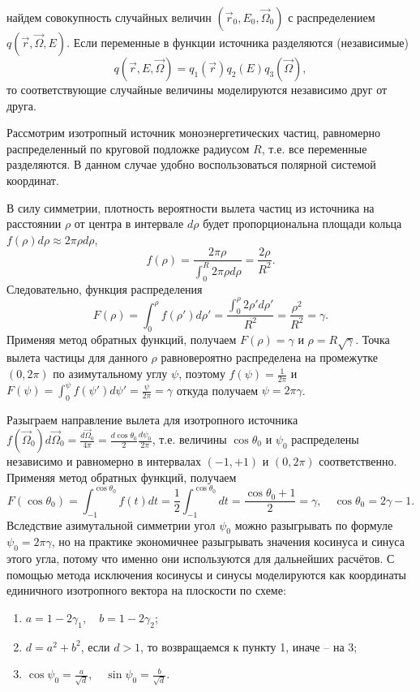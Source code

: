 \documentclass[
11pt,
master, %
subf, %
href, %
colorlinks=true, %
]{disser}
\begin{document}
найдем совокупность случайных величин $\left(\vec{r}_{0}, E_{0},  \vec{\Omega }_{0} \right)$ с распределением $q \left(\vec{r},\vec{\Omega },E \right)$. Если переменные в функции источника разделяются (независимые)
\[q \left(\vec{r},E,\vec{\Omega } \right)=q_{1} \left(\vec{r} \right)q_{2} (E)q_{3} \left(\vec{\Omega } \right),\]
 то соответствующие случайные величины моделируются независимо друг от друга.

Рассмотрим изотропный источник моноэнергетических частиц, равномерно распределенный по круговой подложке радиусом $R$, т.е. все переменные разделяются. В данном случае удобно воспользоваться полярной системой координат.

В силу симметрии, плотность вероятности вылета частиц из источника на расстоянии  $\rho $ от центра в интервале $d\rho $ будет пропорциональна площади кольца  $f(\rho )d\rho \approx 2\pi \rho d\rho $,
\[f(\rho )=\frac{2\pi \rho }{\int _{0}^{R}2\pi \rho d\rho  } =\frac{2\rho }{R^{2} } .\]
Следовательно, функция распределения
\[F(\rho )=\int _{0}^{\rho }f \left( \rho ' \right)d\rho '=\frac{\int _{0}^{\rho }2 \rho 'd\rho '}{R^{2} } =\frac{\rho ^{2} }{R^{2} } =\gamma .\]
Применяя метод обратных функций, получаем $F(\rho )=\gamma $ и $\rho =R\sqrt{\gamma } $. Точка вылета частицы для данного $\rho $ равновероятно распределена на промежутке $(0,2\pi )$ по азимутальному углу $\psi $, поэтому $f(\psi )=\frac{1}{2\pi } $ и $F(\psi )=\int _{0}^{\psi }f \left(\psi ' \right)d\psi '=\frac{\psi }{2\pi } =\gamma $ откуда получаем $\psi =2\pi \gamma $.

Разыграем направление вылета для  изотропного источника   $f \left(\vec{\Omega }_{0} \right)d\vec{\Omega }_{0} =\frac{d\vec{\Omega }_{0} }{4\pi } =\frac{d\cos \theta _{0} }{2} \frac{d\psi _{0} }{2\pi } $, т.е. величины $\cos \theta _{0} $ и $\psi _{0} $ распределены независимо и равномерно в интервалах $(-1,+1)$ и $(0,2\pi )$ соответственно. Применяя метод обратных функций, получаем
\[F(\cos \theta _{0} )=\int _{-1}^{\cos \theta _{0} }f(t)dt =\frac{1}{2} \int _{-1}^{\cos \theta _{0} }dt =\frac{\cos \theta _{0} +1}{2} =\gamma, \quad \cos \theta _{0} =2\gamma -1.\]
Вследствие азимутальной симметрии угол $\psi _{0} $ можно разыгрывать по формуле $\psi _{0} =2\pi \gamma $, но на практике экономичнее разыгрывать значения косинуса и синуса этого угла, потому что именно они используются для дальнейших расчётов. С помощью метода исключения косинусы и синусы моделируются как координаты единичного изотропного вектора на плоскости по схеме:
\begin{enumerate}
  \item $a=1-2\gamma _{1} ,\quad b=1-2\gamma _{2}$;
  \item $d=a^{2} +b^{2} $, если $d>1$, то возвращаемся к пункту 1, иначе -- на 3;
  \item $\cos \psi _{0} =\frac{a}{\sqrt{d} }, \quad \sin \psi _{0} =\frac{b}{\sqrt{d}}$.
\end{enumerate}
\end{document}
